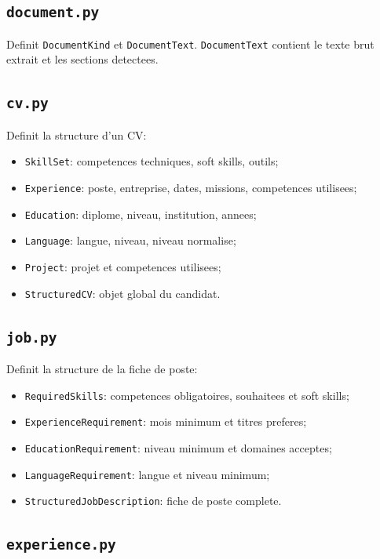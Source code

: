 \documentclass[12pt,a4paper]{article}
\begin{document}
\subsection{\texttt{document.py}}

Definit \texttt{DocumentKind} et \texttt{DocumentText}. \texttt{DocumentText} contient le texte brut extrait et les sections detectees.

\subsection{\texttt{cv.py}}

Definit la structure d'un CV:

\begin{itemize}
  \item \texttt{SkillSet}: competences techniques, soft skills, outils;
  \item \texttt{Experience}: poste, entreprise, dates, missions, competences utilisees;
  \item \texttt{Education}: diplome, niveau, institution, annees;
  \item \texttt{Language}: langue, niveau, niveau normalise;
  \item \texttt{Project}: projet et competences utilisees;
  \item \texttt{StructuredCV}: objet global du candidat.
\end{itemize}

\subsection{\texttt{job.py}}

Definit la structure de la fiche de poste:

\begin{itemize}
  \item \texttt{RequiredSkills}: competences obligatoires, souhaitees et soft skills;
  \item \texttt{ExperienceRequirement}: mois minimum et titres preferes;
  \item \texttt{EducationRequirement}: niveau minimum et domaines acceptes;
  \item \texttt{LanguageRequirement}: langue et niveau minimum;
  \item \texttt{StructuredJobDescription}: fiche de poste complete.
\end{itemize}

\subsection{\texttt{experience.py}}
\end{document}
